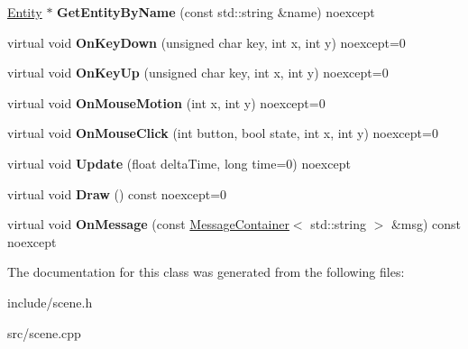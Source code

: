 \begin{DoxyCompactItemize}
\hyperlink{class_blade_1_1_entity}{Entity} $\ast$ {\bfseries Get\+Entity\+By\+Name} (const std\+::string \&name) noexcept
\item 
\mbox{\label{class_blade_1_1_scene_abb80a0590b4d723b5f13ec8c488e513a}} 
virtual void {\bfseries On\+Key\+Down} (unsigned char key, int x, int y) noexcept=0
\item 
\mbox{\label{class_blade_1_1_scene_abe25ad91527c82b56409be7097afbf49}} 
virtual void {\bfseries On\+Key\+Up} (unsigned char key, int x, int y) noexcept=0
\item 
\mbox{\label{class_blade_1_1_scene_aa0296f990fc1cacbfc97f657d6cb958f}} 
virtual void {\bfseries On\+Mouse\+Motion} (int x, int y) noexcept=0
\item 
\mbox{\label{class_blade_1_1_scene_ab54558db189ce57505ede242ffc303d2}} 
virtual void {\bfseries On\+Mouse\+Click} (int button, bool state, int x, int y) noexcept=0
\item 
\mbox{\label{class_blade_1_1_scene_a657797f1b08ac81bea28a2f9ed0e9c6f}} 
virtual void {\bfseries Update} (float delta\+Time, long time=0) noexcept
\item 
\mbox{\label{class_blade_1_1_scene_ad1e610e1b5ea1cc4c6eaeac74e1c365b}} 
virtual void {\bfseries Draw} () const noexcept=0
\item 
\mbox{\label{class_blade_1_1_scene_ac49cdbb30d13096320971ef9389d0a54}} 
virtual void {\bfseries On\+Message} (const \hyperlink{class_blade_1_1_ref_counted_container}{Message\+Container}$<$ std\+::string $>$ \&msg) const noexcept
\end{DoxyCompactItemize}


The documentation for this class was generated from the following files\+:\begin{DoxyCompactItemize}
\item 
include/scene.\+h\item 
src/scene.\+cpp\end{DoxyCompactItemize}
